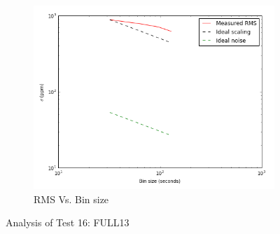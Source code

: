 \documentclass{aastex6}
\begin{document}
\begin{figure}[H]
    \begin{subfigure}{3}
        \includegraphics[scale=0.6]{rms_test16}
        \caption{RMS Vs. Bin size}
    \end{subfigure}
    \caption{Analysis of Test 16: FULL13}
\end{figure}
\end{document}
